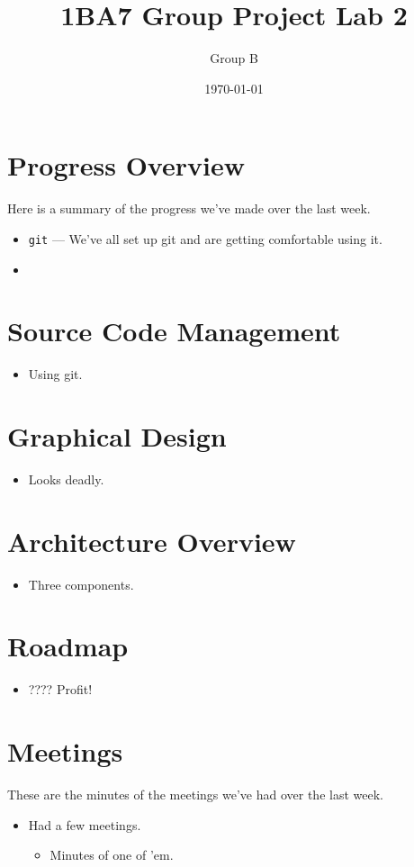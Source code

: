 \documentclass[titlepage,a4paper]{article}
\begin{document}
\title{1BA7 Group Project Lab 2}
\author{Group B}
\date{\today}
\maketitle
\newcommand{\mono}[1]{\texttt{#1}}
\newcommand{\code}[1]{\texttt{#1}}

\section{Progress Overview}
Here is a summary of the progress we've made over the last week.
\begin{itemize}
\item \mono{git} --- We've all set up git and are getting comfortable using it.
\item 
\end{itemize}

\section{Source Code Management}
\begin{itemize}
\item Using git.
\end{itemize}

\section{Graphical Design}
\begin{itemize}
\item Looks deadly.
\end{itemize}

\section{Architecture Overview}
\begin{itemize}
\item Three components.
\end{itemize}

\section{Roadmap}
\begin{itemize}
\item ???? Profit!
\end{itemize}

\section{Meetings}
These are the minutes of the meetings we've had over the last week. 
\begin{itemize}
\item Had a few meetings.\begin{itemize}
	\item Minutes of one of 'em.
\end{itemize}
\end{itemize}
\end{document}
